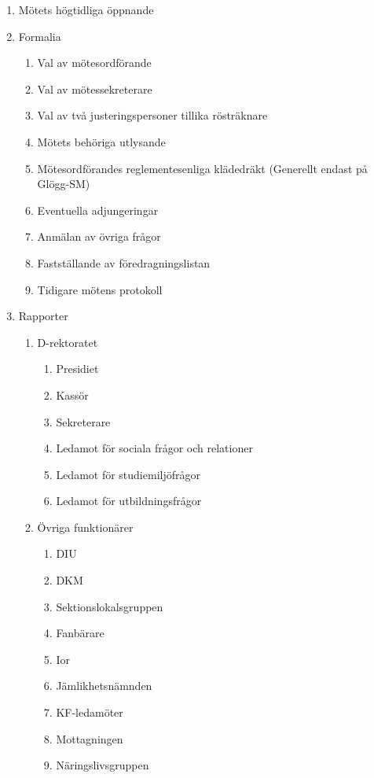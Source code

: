 \documentclass{dgovdoc}
\begin{document}
\begin{enumerate}
  \item Mötets högtidliga öppnande
  \item Formalia
  \begin{enumerate}
      \item Val av mötesordförande
      \item Val av mötessekreterare
      \item Val av två justeringspersoner tillika rösträknare
      \item Mötets behöriga utlysande
      \item Mötesordförandes reglementesenliga klädedräkt (Generellt endast på
        Glögg-SM)
      \item Eventuella adjungeringar
      \item Anmälan av övriga frågor
      \item Fastställande av föredragningslistan
      \item Tidigare mötens protokoll
  \end{enumerate}
  \item Rapporter
  \begin{enumerate}
      \item D-rektoratet
      \begin{enumerate}
          \item Presidiet
          \item Kassör
          \item Sekreterare
          \item Ledamot för sociala frågor och relationer
          \item Ledamot för studiemiljöfrågor
          \item Ledamot för utbildningsfrågor
      \end{enumerate}
      \item Övriga funktionärer
      \begin{enumerate}
          \item DIU
          \item DKM
          \item Sektionslokalsgruppen
          \item Fanbärare
          \item Ior
          \item Jämlikhetsnämnden
          \item KF-ledamöter
          \item Mottagningen
          \item Näringslivsgruppen

\end{enumerate}
\end{enumerate}
\end{enumerate}
\end{document}
